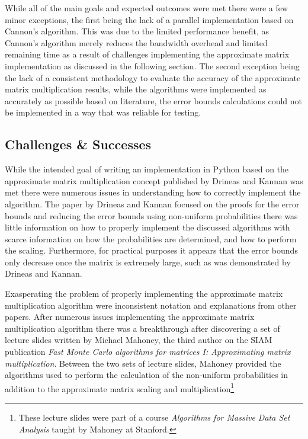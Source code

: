 \documentclass[oneside]{article}
\begin{document}
While all of the main goals and expected outcomes were met there were a few minor exceptions, the first being the lack of a parallel implementation based on Cannon's algorithm. This was due to the limited performance benefit, as Cannon's algorithm merely reduces the bandwidth overhead\cite{lee1997generalized} and limited remaining time as a result of challenges implementing the approximate matrix implementation as discussed in the following section. The second exception being the lack of a consistent methodology to evaluate the accuracy of the approximate matrix multiplication results, while the algorithms were implemented as accurately as possible based on literature, the error bounds calculations could not be implemented in a way that was reliable for testing.



\subsection{Challenges \& Successes}


While the intended goal of writing an implementation in Python based on the approximate matrix multiplication concept published by Drineas and Kannan was met there were numerous issues in understanding how to correctly implement the algorithm. The paper by Drineas and Kannan focused on the proofs for the error bounds and reducing the error bounds using non-uniform probabilities there was little information on how to properly implement the discussed algorithms with scarce information on how the probabilities are determined, and how to perform the scaling. Furthermore, for practical purposes it appears that the error bounds only decrease once the matrix is extremely large, such as was demonstrated by Drineas and Kannan\cite{drineas2001fast}.

Exasperating the problem of properly implementing the approximate matrix multiplication algorithm were inconsistent notation and explanations from other papers. After numerous issues implementing the approximate matrix multiplication algorithm there was a breakthrough after discovering a set of lecture slides written by Michael Mahoney, the third author on the SIAM publication \emph{Fast Monte Carlo algorithms for matrices I: Approximating matrix multiplication}\cite{drineas2006fastI}. Between the two sets of lecture slides\cite{mahoneyCS369M, mahoneyCS294}, Mahoney provided the algorithms used to perform the calculation of the non-uniform probabilities in addition to the approximate matrix scaling and multiplication\footnote{These lecture slides were part of a course \emph{Algorithms for Massive Data Set Analysis} taught by Mahoney at Stanford.}
\end{document}
